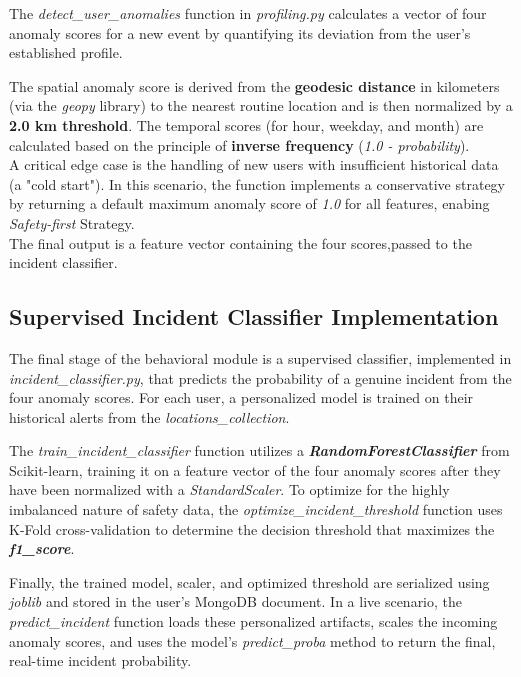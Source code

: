 \documentclass[12pt,a4paper,oneside,english]{book}
\begin{document}
The \textit{detect\_user\_anomalies} function in \textit{profiling.py} calculates a vector of four anomaly scores for a new event by quantifying its deviation from the user's established profile.

The spatial anomaly score is derived from the \textbf{geodesic distance} in kilometers (via the \textit{geopy} library) to the nearest routine location and is then normalized by a \textbf{2.0 km threshold}. The temporal scores (for hour, weekday, and month) are calculated based on the principle of \textbf{inverse frequency} (\textit{1.0 - probability}).
\\A critical edge case is the handling of new users with insufficient historical data (a "cold start"). In this scenario, the function implements a conservative strategy by returning a default maximum anomaly score of \textit{1.0} for all features, enabing \textit{Safety-first} Strategy.
\\The final output is a feature vector containing the four scores,passed to the incident classifier.
\subsection{Supervised Incident Classifier Implementation}
\label{sec:Incident_class_impl}

The final stage of the behavioral module is a supervised classifier, implemented in \textit{incident\_classifier.py}, that predicts the probability of a genuine incident from the four anomaly scores. For each user, a personalized model is trained on their historical alerts from the \textit{locations\_collection}.

The \textit{train\_incident\_classifier} function utilizes a \textbf{\textit{RandomForestClassifier}} from Scikit-learn, training it on a feature vector of the four anomaly scores after they have been normalized with a \textit{StandardScaler}. To optimize for the highly imbalanced nature of safety data, the \textit{optimize\_incident\_threshold} function uses K-Fold cross-validation to determine the decision threshold that maximizes the \textbf{\textit{f1\_score}}.

Finally, the trained model, scaler, and optimized threshold are serialized using \textit{joblib} and stored in the user's MongoDB document. In a live scenario, the \textit{predict\_incident} function loads these personalized artifacts, scales the incoming anomaly scores, and uses the model's \textit{predict\_proba} method to return the final, real-time incident probability.
\end{document}
